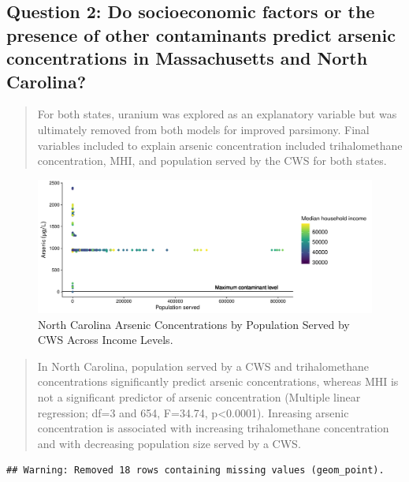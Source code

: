 \documentclass[12pt,]{article}
\begin{document}
\hypertarget{question-2-do-socioeconomic-factors-or-the-presence-of-other-contaminants-predict-arsenic-concentrations-in-massachusetts-and-north-carolina}{%
\subsection{Question 2: Do socioeconomic factors or the presence of
other contaminants predict arsenic concentrations in Massachusetts and
North
Carolina?}\label{question-2-do-socioeconomic-factors-or-the-presence-of-other-contaminants-predict-arsenic-concentrations-in-massachusetts-and-north-carolina}}

\begin{quote}
For both states, uranium was explored as an explanatory variable but was
ultimately removed from both models for improved parsimony. Final
variables included to explain arsenic concentration included
trihalomethane concentration, MHI, and population served by the CWS for
both states.
\end{quote}

\begin{figure}
\centering
\includegraphics{Project_Template_files/figure-latex/figs9-1.pdf}
\caption{North Carolina Arsenic Concentrations by Population Served by
CWS Across Income Levels.}
\end{figure}

\begin{quote}
In North Carolina, population served by a CWS and trihalomethane
concentrations significantly predict arsenic concentrations, whereas MHI
is not a significant predictor of arsenic concentration (Multiple linear
regression; df=3 and 654, F=34.74, p\textless{}0.0001). Inreasing
arsenic concentration is associated with increasing trihalomethane
concentration and with decreasing population size served by a CWS.
\end{quote}

\begin{verbatim}
## Warning: Removed 18 rows containing missing values (geom_point).
\end{verbatim}
\end{document}
